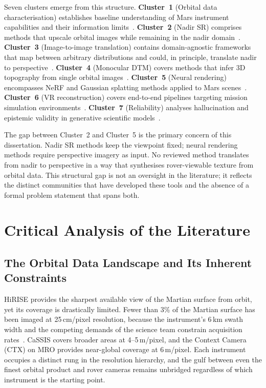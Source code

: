 \documentclass[10pt,journal]{IEEEtran}
\begin{document}
Seven clusters emerge from this structure. \textbf{Cluster~1} (Orbital data
characterisation) establishes baseline understanding of Mars instrument
capabilities and their information limits~\cite{serrano2013hirise,
osadnik2025mcted}. \textbf{Cluster~2} (Nadir SR) comprises methods that upscale
orbital images while remaining in the nadir domain~\cite{tao2021cassis,
wu2024rstsrn, lu2025thermal, khanna2024diffusionsat, zhu2025taming}.
\textbf{Cluster~3} (Image-to-image translation) contains domain-agnostic
frameworks that map between arbitrary distributions and could, in principle,
translate nadir to perspective~\cite{kim2024unsb, xiao2025brownian}.
\textbf{Cluster~4} (Monocular DTM) covers methods that infer 3D topography from
single orbital images~\cite{tao2021madnet, zou2026pfmgan, cao2024gen3d}.
\textbf{Cluster~5} (Neural rendering) encompasses NeRF and Gaussian splatting
methods applied to Mars scenes~\cite{giusti2022marf, li2025martian,
dealmeida2025neural3d, martinezpetersen2025hifi, paul2025nerfspace}.
\textbf{Cluster~6} (VR reconstruction) covers end-to-end pipelines targeting
mission simulation environments~\cite{catalano2025inpainting, li2025martian}.
\textbf{Cluster~7} (Reliability) analyses hallucination and epistemic validity
in generative scientific models~\cite{aithal2024hallucination,
rathkopf2025reliability}.

The gap between Cluster~2 and Cluster~5 is the primary concern of this
dissertation. Nadir SR methods keep the viewpoint fixed; neural rendering
methods require perspective imagery as input. No reviewed method translates from
nadir to perspective in a way that synthesises rover-viewable texture from
orbital data. This structural gap is not an oversight in the literature; it
reflects the distinct communities that have developed these tools and the absence
of a formal problem statement that spans both.

\section{Critical Analysis of the Literature}
\label{sec:analysis}

\subsection{The Orbital Data Landscape and Its Inherent Constraints}
\label{subsec:data}

HiRISE provides the sharpest available view of the Martian surface from orbit,
yet its coverage is drastically limited. Fewer than 3\% of the Martian surface
has been imaged at 25\,cm/pixel resolution, because the instrument's 6\,km swath
width and the competing demands of the science team constrain acquisition
rates~\cite{tao2021madnet}. CaSSIS covers broader areas at 4--5\,m/pixel, and
the Context Camera (CTX) on MRO provides near-global coverage at 6\,m/pixel.
Each instrument occupies a distinct rung in the resolution hierarchy, and the
gulf between even the finest orbital product and rover cameras remains
unbridged regardless of which instrument is the starting point.
\end{document}
